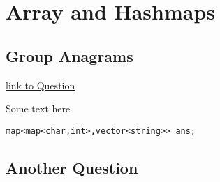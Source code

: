 \documentclass[11pt]{article}
\begin{document}
\section{Array and Hashmaps}
\subsection{Group Anagrams}
\href{https://leetcode.com/problems/group-anagrams/submissions/}{link to Question}

Some text here
\begin {lstlisting}
map<map<char,int>,vector<string>> ans;
\end{lstlisting}

\subsection{Another Question}
\end{document}
